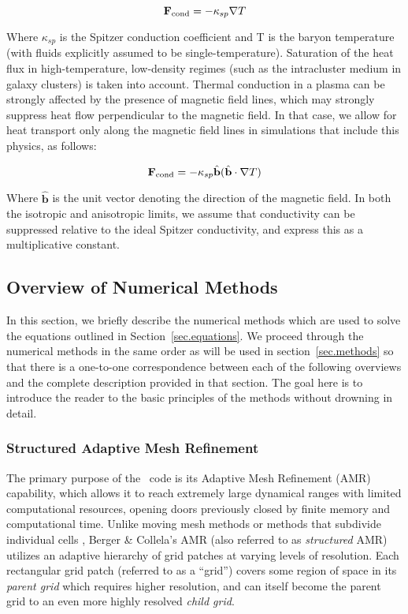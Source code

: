 \begin{equation}
\fcond = -\kappa_{sp} \nabla T
\end{equation}

Where $\kappa_{sp}$ is the Spitzer conduction coefficient
\citep{1962pfig.book.....S} and T is the baryon temperature (with
fluids explicitly assumed to be single-temperature).  Saturation of the heat flux in
high-temperature, low-density regimes (such as the intracluster medium
in galaxy clusters) is taken into account.  Thermal conduction in a
plasma can be strongly affected by the presence of magnetic field
lines, which may strongly suppress heat flow perpendicular to the
magnetic field.  In that case, we allow for heat transport only along
the magnetic field lines in simulations that include this physics, as follows:

\begin{equation}
\fcond= -\kappa_{sp} \hat{\textbf{b}} (\hat{\textbf{b}} \cdot \nabla T)
\end{equation}

Where $\hat{\textbf{b}}$ is the unit vector denoting the direction of the
magnetic field.  In both the isotropic and anisotropic limits, we
assume that conductivity can be suppressed relative to the ideal
Spitzer conductivity, and express this as a multiplicative constant.


\subsection{Overview of Numerical Methods}
\label{sec.method_overview}

In this section, we briefly describe the numerical methods which are
used to solve the equations outlined in Section~\ref{sec.equations}.  We
proceed through the numerical methods in the same order as will be used in
section~\ref{sec.methods} so that there is a one-to-one correspondence
between each of the following overviews and the complete description
provided in that section.  The goal here is to introduce the reader to
the basic principles of the methods without drowning in detail.

\subsubsection{Structured Adaptive Mesh Refinement}

The primary purpose of the \enzo\ code is its Adaptive Mesh Refinement (AMR)
capability, which allows it to reach extremely large dynamical ranges
with limited computational resources, opening doors previously closed
by finite memory and computational time. Unlike moving mesh methods
\citep{1995ApJS..100..269P,1995ApJS...97..231G} or  
methods that subdivide 
individual cells \citep{Adjerid}, Berger \& Collela's AMR (also referred 
to as \emph{structured} AMR) utilizes an adaptive hierarchy of grid 
patches at varying levels of resolution.  Each rectangular grid patch 
(referred to as a ``grid'') covers some region of space in its 
\emph{parent grid} which requires higher resolution, and can itself 
become the parent grid to an even more highly resolved \emph{child grid}. 

